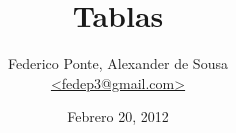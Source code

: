 \documentclass[11pt,fleqn]{article}
\begin{document}
\title{Tablas}
\author{Federico Ponte, Alexander de Sousa\\
\href{mailto:fedep3@gmail.com}{<fedep3@gmail.com>}}

\date{Febrero 20, 2012}
\maketitle


































\end{document}
